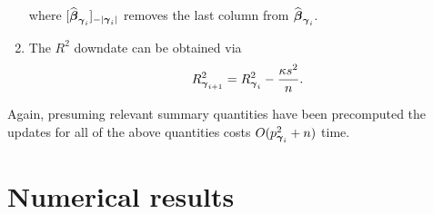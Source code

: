 \documentclass{article}[12pt]
\begin{document}
\begin{enumerate}
	\noindent where $[ \widehat{{\boldsymbol \beta}}_{{\boldsymbol \gamma}_{i}}]_{-|{{\boldsymbol \gamma}_{i}}|}$
	removes the last column from $\widehat{{\boldsymbol \beta}}_{{\boldsymbol \gamma}_{i}}$.
	
	\item 
	The $R^2$ downdate can be obtained
	via
	$$
	R_{{\boldsymbol \gamma}_{i+1}}^2 = R_{{\boldsymbol \gamma}_{i}}^2 - \frac{\kappa s^2}{n}.
	$$
	
	
\end{enumerate}

\noindent Again, presuming relevant summary quantities have been precomputed
the updates for all of the above quantities costs $O(p_{{\boldsymbol \gamma}_{i}}^2 + n)$ time.



 
 
\section{Numerical results}
\label{sec:numerical}
\end{document}
